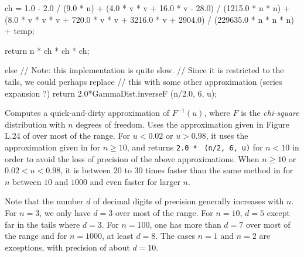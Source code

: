 \begin{code}
\begin{hide}
{{        ch = 1.0 - 2.0 / (9.0 * n) + (4.0 * v * v + 16.0 * v -
           28.0) / (1215.0 * n * n) + (8.0 * v * v * v + 720.0 * v * v +
           3216.0 * v + 2904.0) / (229635.0 * n * n * n) + temp;

        return n * ch * ch * ch;

    } else {
    // Note: this implementation is quite slow.
    // Since it is restricted to the tails, we could perhaps replace
    // this with some other approximation (series expansion ?)
        return 2.0*GammaDist.inverseF (n/2.0, 6, u);
    }
}\end{hide}
\end{code}
\begin{tabb}  Computes a quick-and-dirty approximation of $F^{-1}(u)$, 
  where $F$ is the {\em chi-square\/} distribution with $n$ degrees of freedom.
  Uses the approximation given in  Figure L.24 of  
   over most of the range.
  For $u < 0.02$ or $u > 0.98$, it uses the approximation given in 
    for $n \ge 10$, and returns 
  \texttt{2.0 *}
  ~\texttt{(n/2, 6, u)}
   for $n < 10$ in order to avoid
  the loss of precision of the above approximations. 
   When $n \ge 10$ or $0.02 < u < 0.98$,
  it is between 20 to 30 times faster than the same method in
   for $n$ between $10$ and $1000$ and even faster
  for larger $n$. 

  Note that the number $d$ of decimal digits of precision
  generally increases with $n$. For $n=3$, we only have $d = 3$ over
  most of the range. For $n=10$, $d=5$ except far in the tails where $d = 3$.
  For $n=100$, one has more than $d=7$ over most of the range and for
  $n=1000$, at least $d=8$.
  The cases $n = 1$ and $n = 2$ are exceptions, with precision of about $d=10$.
\end{tabb}
\begin{code}\begin{hide}
}\end{hide}
\end{code}
